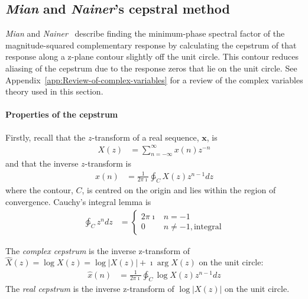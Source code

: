 \documentclass[a4paper,twoside,10pt,english]{report}
\begin{document}
\subsection{\emph{Mian} and \emph{Nainer}'s cepstral method}
\emph{Mian} and
\emph{Nainer}~\cite{MianNainer_FastDesignEquiRippleMinimumPhaseFIR} describe
finding the minimum-phase spectral factor of the magnitude-squared complementary
response by calculating the cepstrum of that response along a z-plane
contour slightly off the unit circle. This contour reduces aliasing of the
cepstrum due to the response zeros that lie on the unit circle. See
Appendix~\ref{app:Review-of-complex-variables} for a review of the complex
variables theory used in this section.
\paragraph{Properties of the cepstrum}
Firstly, recall that the $z$-transform of a real sequence, $\boldsymbol{x}$, is
\begin{align*}
  X\left(z\right) &= \sum_{n=-\infty}^{\infty} x\left(n\right)z^{-n}
\end{align*}
and that the inverse $z$-transform is
\begin{align*}
x\left(n\right)&=\frac{1}{2\pi\imath}\ointctrclockwise_{C}X\left(z\right)z^{n-1}dz
\end{align*}
where the contour, $C$, is centred on the origin and lies within the region of
convergence. Cauchy's integral lemma is
\begin{align*}
\ointctrclockwise_{C}z^{n}dz &=\begin{cases}
2\pi\imath  & n=-1 \\
0 & n \ne -1, \text{integral}
\end{cases}
\end{align*}

The \emph{complex cepstrum} is the inverse z-transform of
$\hat{X}\left(z\right)=\log X\left(z\right)=\log\left|X\left(z\right)\right| + \imath \arg X\left(z\right)$ on the unit circle:
\begin{align*}
\hat{x}\left(n\right)&=
\frac{1}{2\pi\imath}\ointctrclockwise_{C}\log X\left(z\right)z^{n-1}dz
\end{align*}
The \emph{real cepstrum} is the inverse z-transform of
$\log\left|X\left(z\right)\right|$ on the unit circle.
\end{document}
